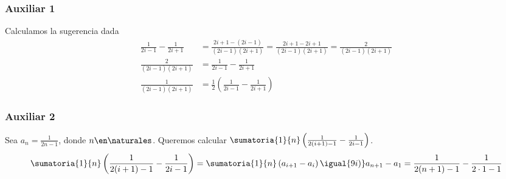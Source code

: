 \begin{enumerate}[label=\roman*)]
        \subsubsection*{Auxiliar 1}
        Calculamos la sugerencia dada
        \begin{align*}
          \frac{1}{2i-1} - \frac{1}{2i+1} & = \frac{2i+1 - (2i-1)}{(2i-1)(2i+1)} = \frac{2i+1 - 2i+1}{(2i-1)(2i+1)}= \frac{2}{(2i-1)(2i+1)} \\
          \frac{2}{(2i-1)(2i+1)}          & = \frac{1}{2i-1} - \frac{1}{2i+1}                                                               \\
          \frac{1}{(2i-1)(2i+1)}          & = \frac{1}{2} \left( \frac{1}{2i-1} - \frac{1}{2i+1} \right)
        \end{align*}

        \subsubsection*{Auxiliar 2}
        Sea $ a_n = \frac{1}{2n-1}$, donde $n \en \naturales $. Queremos calcular $ \sumatoria{1}{n} \left(\frac{1}{2(i+1)-1} - \frac{1}{2i-1}\right)$.
        \begin{align*}
          \sumatoria{1}{n} \left( \frac{1}{2(i+1)-1} - \frac{1}{2i-1}\right) =
          \sumatoria{1}{n} \left(a_{i+1}- a_i \right) \igual{9i)}
          a_{n+1} - a_1 =
          \frac{1}{2(n+1)-1} - \frac{1}{2\cdot 1-1}
        \end{align*}
\end{enumerate}
